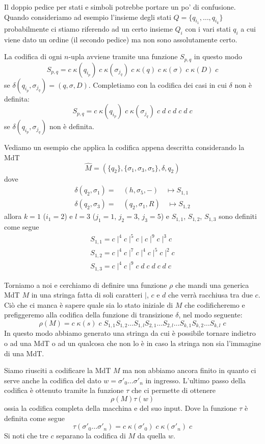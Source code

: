 Il doppio pedice per stati e simboli potrebbe portare un po' di
confusione. Quando consideriamo ad esempio l'insieme degli stati
$Q = \{ q_{i_1}, \dots, q_{i_k} \}$ probabilmente ci stiamo
riferendo ad un certo insieme $Q_i$ con i vari stati $q_i$ a cui
viene dato un ordine (il secondo pedice) ma non sono
assolutamente certo.

La codifica di ogni $n$-upla avviene tramite una funzione
$S_{p,q}$ in questo modo
\[
	S_{p,q} = c \; \kappa (q_{i_p})
	\; c \; \kappa (\sigma_{j_q})
	\; c \; \kappa (q)
	\; c \; \kappa (\sigma)
	\; c \; \kappa (D) \; c
\]
se $\delta (q_{i_p}, \sigma_{j_q}) = (q, \sigma, D)$. Completiamo
con la codifica dei casi in cui $\delta$ non è definita:
\[
	S_{p,q} = c \; \kappa (q_{i_p})
	\; c \; \kappa (\sigma_{j_q})
	\; c \; d \; c \; d \; c \; d \; c
\]
se $\delta(q_{i_p}, \sigma_{j_q})$ non è definita.

\begin{example}
	Vediamo un esempio che applica la codifica appena descritta
	considerando la MdT
	\[
		\hat{M} = (\{ q_2 \}, \{ \sigma_1, \sigma_3, \sigma_5 \},
		\delta, q_2)
	\]
	dove
	\begin{gather*}
		\delta(q_2, \sigma_1) = \quad (h, \sigma_5, -)
		\quad \mapsto S_{1,1} \\
		\delta(q_2, \sigma_3) = \quad (q_2, \sigma_1, R)
		\quad \mapsto S_{1,2}
	\end{gather*}
	allora $k=1$ ($i_1=2$) e $l = 3$ ($j_1 = 1$, $j_2 = 3$,
	$j_3 = 5$) e $S_{1,1}$, $S_{1,2}$, $S_{1,3}$ sono definiti
	come segue
	\begin{gather*}
		S_{1,1} = c \mid^4 c \mid^5 c \mid c \mid^9 c \mid^3 c \\
		S_{1,2} = c \mid^4 c \mid^7 c \mid^4 c \mid^5 c \mid^2 c \\
		S_{1,3} = c \mid^4 c \mid^9 c \; d \; c \; d \; c \; d \; c
	\end{gather*}
\end{example}

Torniamo a noi e cerchiamo di definire una funzione $\rho$ che
mandi una generica MdT $M$ in una stringa fatta di soli caratteri
$\mid$, $c$ e $d$ che verrà racchiusa tra due $c$. Ciò che ci
manca è sapere quale sia lo stato iniziale di $M$ che
codificheremo e prefiggeremo alla codifica della funzione di
transizione $\delta$, nel modo seguente:
\[
	\rho (M) = c \; \kappa (s) \; c \;
	S_{1,1} S_{1,2} \dots
	S_{1,l} S_{2,1} \dots S_{2,l} \dots
	S_{k,1} S_{k,2} \dots S_{k,l} \; c
\]
In questo modo abbiamo generato una stringa da cui è possibile
tornare indietro o ad una MdT o ad un qualcosa che non lo è in
caso la stringa non sia l'immagine di una MdT.

Siamo riusciti a codificare la MdT $M$ ma non abbiamo ancora
finito in quanto ci serve anche la codifica del dato
$w = \sigma'_0 \dots \sigma'_n$ in ingresso. L'ultimo passo
della codifica è ottenuto tramite la funzione $\tau$ che ci
permette di ottenere
\[ \rho(M) \tau(w) \]
ossia la codifica completa della macchina e del suo input. Dove
la funzione $\tau$ è definita come segue
\[
	\tau(\sigma'_0 \dots \sigma'_n) =
	c \; \kappa(\sigma'_0) \;
	c \; \kappa(\sigma'_n) \; c
\]
Si noti che tre $c$ separano la codifica di $M$ da quella $w$.